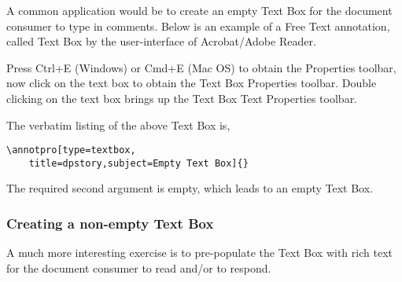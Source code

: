 \documentclass[12pt]{article}
\let\app\textsf
\let\uif\textsf
\begin{document}
A common application would be to create an empty \uif{Text Box} for the
document consumer to type in comments. Below is an example of a \uif{Free
Text} annotation, called \uif{Text Box} by the user-interface of
\app{Acrobat}/\app{Adobe Reader}.
\begin{flushleft} %
\begin{minipage}{2in}
\annotpro[title=dpstory,type=textbox,subject=Empty Text Box]{}
\end{minipage}\hfill
\begin{minipage}{\linewidth-2in-10pt}\small
Press \uif{Ctrl+E} (\app{Windows}) or \uif{Cmd+E} (\app{Mac OS}) to obtain
the \uif{Properties} toolbar, now click on the text box  to obtain the
\uif{Text Box Properties} toolbar. Double clicking on the text box
brings up the \uif{Text Box Text Properties} toolbar.
\end{minipage}
\end{flushleft}
The verbatim listing of the above \uif{Text Box} is,
\begin{Verbatim}[xleftmargin=\leftmargini]
\annotpro[type=textbox,
    title=dpstory,subject=Empty Text Box]{}
\end{Verbatim}
The required second argument is empty, which leads to an empty \uif{Text Box}.

\subsubsection{Creating a non-empty \texorpdfstring{\protect\uif{Text Box}}{Text Box}}

A much more interesting exercise is to pre-populate the \uif{Text Box} with rich text for the
document consumer to read and/or to respond.

\end{document}
